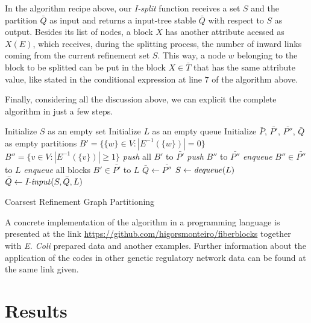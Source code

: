 \documentclass[12pt]{diazessay} %
\begin{document}
In the algorithm recipe above, our \textit{I-split} function receives a set $S$ and the partition $\bar{Q}$ as input and returns a input-tree stable $\bar{Q}$ with respect to $S$ as output. Besides its list of nodes, a block $X$ has another attribute acessed as $X(E)$, which receives, during the splitting process, the number of inward links coming from the current refinement set $S$. This way, a node $w$ belonging to the block to be splitted can be put in the block $X \in \bar{T}$ that has the same attribute value, like stated in the conditional expression at line $7$ of the algorithm above.

Finally, considering all the discussion above, we can explicit the complete algorithm in just a few steps.

\begin{algorithm}[h]
	\SetAlgoLined
	Initialize $S$ as an empty set\;
	Initialize $L$ as an empty queue\;
	Initialize $\bar{P}$, $\bar{P'}$, $\bar{P''}$, $\bar{Q}$ as empty partitions\;
	$B' = \{ \{ w \} \in V : |E^{-1}(\{w\})|=0 \}$\;
	$B'' = \{ v \in V : |E^{-1}(\{v\})| \geq 1 \}$\;
	\textit{push} all $B'$ to $\bar{P'}$\;
	\textit{push} $B''$ to $\bar{P''}$\;
	\textit{enqueue} $B'' \in \bar{P''}$ to $L$\;
	\textit{enqueue} all blocks $B' \in \bar{P'}$ to $L$\;
	$\bar{Q} \leftarrow \bar{P''}$\;
	{
		$S \leftarrow \text{\textit{dequeue}}(L)$\;
		$\bar{Q} \leftarrow \text{\textit{I-input}}(S, \bar{Q}, L)$
	}
	\caption{Coarsest Refinement Graph Partitioning}
\end{algorithm}

A concrete implementation of the algorithm in a programming language is presented at the link \url{https://github.com/higorsmonteiro/fiberblocks} together with \textit{E. Coli} prepared data and another examples. Further information about the application of the codes in other genetic regulatory network data can be found at the same link given.


\section*{Results}
\end{document}
